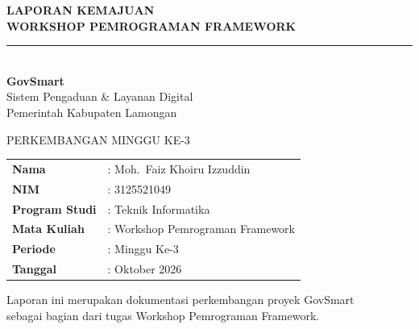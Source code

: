 \documentclass[12pt,a4paper]{article}
\begin{document}
\begin{titlepage}
  \centering
  \vspace*{1.5cm}

  {\Huge\bfseries\color{accent} LAPORAN KEMAJUAN\\[6pt]
   \Large WORKSHOP PEMROGRAMAN FRAMEWORK}\\[0.4cm]
  {\large\color{gray}\rule{12cm}{1.5pt}}\\[0.6cm]

  {\LARGE\bfseries GovSmart}\\[0.2cm]
  {\large\color{gray}
    Sistem Pengaduan \& Layanan Digital\\
    Pemerintah Kabupaten Lamongan}\\[0.8cm]

  \begin{tcolorbox}[
    enhanced, width=10cm,
    colback=accentlight, colframe=accent,
    arc=10pt, boxrule=1.2pt,
    fontupper=\bfseries\large\color{accent},
    halign=center
  ]
    PERKEMBANGAN MINGGU KE-3
  \end{tcolorbox}

  \vspace{1.5cm}

  \begin{tabular}{ll}
    \textbf{Nama}          & : Moh.\ Faiz Khoiru Izzuddin \\[4pt]
    \textbf{NIM}           & : 3125521049 \\[4pt]
    \textbf{Program Studi} & : Teknik Informatika \\[4pt]
    \textbf{Mata Kuliah}   & : Workshop Pemrograman Framework \\[4pt]
    \textbf{Periode}       & : Minggu Ke-3 \\[4pt]
    \textbf{Tanggal}       & : Oktober 2026 \\
  \end{tabular}

  \vfill
  {\small\color{gray}
    Laporan ini merupakan dokumentasi perkembangan proyek GovSmart\\
    sebagai bagian dari tugas Workshop Pemrograman Framework.}
\end{titlepage}

\tableofcontents
\newpage
\end{document}
